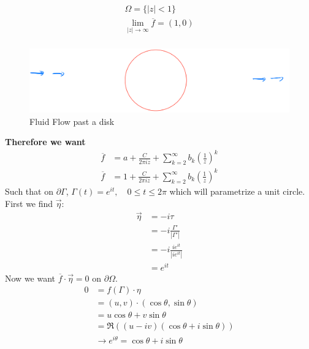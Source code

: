 \begin{example}
    \begin{align*}
        \Omega = \{|z| < 1\}                        \\
        \lim_{|z| \to \infty} \overline{f} = (1, 0) \\
    \end{align*}
    \begin{figure}[H]
        \centering
        \includegraphics[width=\textwidth]{LECTURE_19/disk.png}
        \caption{Fluid Flow past a disk}
    \end{figure}
    \textbf{Therefore we want}
    \begin{align*}
        \overline{f} & = a + \frac{C}{2\pi i z} + \sum_{k = 2}^{\infty}b_k(\frac{1}z)^k \\
        \overline{f} & = 1 + \frac{C}{2\pi i z} + \sum_{k = 2}^{\infty}b_k(\frac{1}z)^k
    \end{align*}
    Such that on $\partial \Gamma$, $\Gamma(t) = e^{it}, \quad 0 \leq t \leq 2\pi$ which will parametrize a unit circle. First we find $\vec{\eta}$:
    \begin{align}
        \vec{\eta} & = -i\tau                       \\
                   & = -i\frac{\Gamma'}{|\Gamma'|}  \\
                   & = -i\frac{i e^{it}}{|ie^{it}|} \\
                   & = e^{it}
    \end{align}
    Now we want $\overline{f} \cdot \vec{\eta} = 0$ on $\partial \Omega$.
    \begin{align*}
        0 & = f(\Gamma) \cdot \eta                                            \\
          & = (u,v)\cdot(\cos\theta,\sin\theta)                               \\
          & = u\cos\theta + v\sin\theta                                       \\
          & = \Re((u - iv) (\cos\theta + i\sin\theta))                        \\
          & \rightarrow e^{i\theta} = \cos\theta + i\sin\theta                \\

\end{align*}
\end{example}
